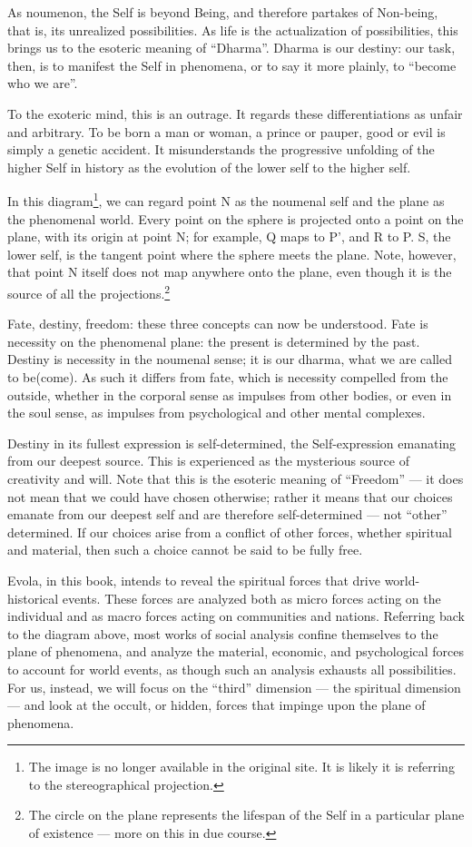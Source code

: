 As noumenon, the Self is beyond Being, and therefore partakes of Non-being, that is, its unrealized possibilities. As life is the actualization of possibilities, this brings us to the esoteric meaning of ``Dharma''. Dharma is our destiny: our task, then, is to manifest the Self in phenomena, or to say it more plainly, to ``become who we are''.

To the exoteric mind, this is an outrage. It regards these differentiations as unfair and arbitrary. To be born a man or woman, a prince or pauper, good or evil is simply a genetic accident. It misunderstands the progressive unfolding of the higher Self in history as the evolution of the lower self to the higher self.

In this diagram\footnote{The image is no longer available in the original site. It is likely it is referring to the stereographical projection.}, we can regard point N as the noumenal self and the plane as the phenomenal world. Every point on the sphere is projected onto a point on the plane, with its origin at point N; for example, Q maps to P', and R to P. S, the lower self, is the tangent point where the sphere meets the plane. Note, however, that point N itself does not map anywhere onto the plane, even though it is the source of all the projections.\footnote{The circle on the plane represents the lifespan of the Self in a particular plane of existence --- more on this in due course.}

Fate, destiny, freedom: these three concepts can now be understood. Fate is necessity on the phenomenal plane: the present is determined by the past. Destiny is necessity in the noumenal sense; it is our dharma, what we are called to be(come). As such it differs from fate, which is necessity compelled from the outside, whether in the corporal sense as impulses from other bodies, or even in the soul sense, as impulses from psychological and other mental complexes.

Destiny in its fullest expression is self-determined, the Self-expression emanating from our deepest source. This is experienced as the mysterious source of creativity and will. Note that this is the esoteric meaning of ``Freedom'' --- it does not mean that we could have chosen otherwise; rather it means that our choices emanate from our deepest self and are therefore self-determined --- not ``other'' determined. If our choices arise from a conflict of other forces, whether spiritual and material, then such a choice cannot be said to be fully free.

Evola, in this book, intends to reveal the spiritual forces that drive world-historical events. These forces are analyzed both as micro forces acting on the individual and as macro forces acting on communities and nations. Referring back to the diagram above, most works of social analysis confine themselves to the plane of phenomena, and analyze the material, economic, and psychological forces to account for world events, as though such an analysis exhausts all possibilities. For us, instead, we will focus on the ``third'' dimension --- the spiritual dimension --- and look at the occult, or hidden, forces that impinge upon the plane of phenomena.


